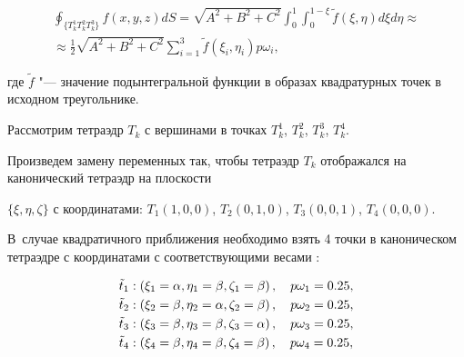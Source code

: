 \begin{multline}

\oint _{\{T^1_kT^2_kT^3_k\}}f\left(x,y,z\right)dS=\sqrt{A^2+B^2+C^2} 

\int^1_0\int^{1-\xi}_0\tilde{f}\left(\xi,\eta\right)d\xi d\eta \approx

\\

\approx \frac{1}{2} \sqrt{A^2+B^2+C^2}\sum^3_{i=1}\tilde{f}

\left(\xi_i,\eta_i\right)p\omega_i, 

\end{multline}

где $\tilde{f}$ "--- значение подынтегральной функции в образах квадратурных точек в исходном треугольнике.



\smallskip




Рассмотрим тетраэдр $T_k$ с вершинами в точках $T^1_k$, $T^2_k$, $T^3_k$, $T^4_k$. 

Произведем замену переменных так, чтобы тетраэдр $T_k$ отображался на канонический тетраэдр на плоскости 

$\{\xi, \eta, \zeta\}$ с координатами: $T_1\left(1, 0, 0\right)$, $T_2\left(0, 1, 0\right)$, $T_3\left(0 , 0, 1\right)$, $T_4\left(0, 0, 0\right)$. 

В~случае квадратичного приближения необходимо взять 4 точки в каноническом тетраэдре с координатами с соответствующими весами \cite{Masyagin:bib:Li}:

\begin{align}

&\tilde{t}_1:\left(\xi_1=\alpha,\eta_1=\beta,\zeta_1=\beta\right), \quad p\omega_1=0.25,\notag\\

&\tilde{t}_2:\left(\xi_2=\beta,\eta_2=\alpha,\zeta_2=\beta\right), \quad p\omega_2=0.25,\notag\\

&\tilde{t}_3:\left(\xi_3=\beta,\eta_3=\beta,\zeta_3=\alpha\right), \quad p\omega_3=0.25,\notag\\

&\tilde{t}_4:\left(\xi_4=\beta,\eta_4=\beta,\zeta_4=\beta\right), \quad p\omega_4=0.25,\notag

\end{align}

